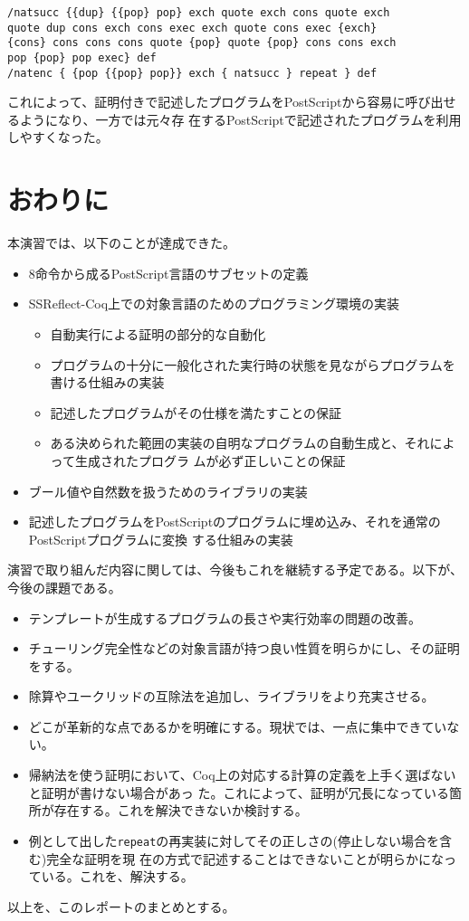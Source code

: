 \documentclass[a4paper, 10pt, twocolumn, titlepage]{ujarticle}
\renewcommand{\{}{\symbol{"7B}}
\renewcommand{\}}{\symbol{"7D}}
\begin{document}
\begin{lstlisting}[style=plain]
/natsucc {{dup} {{pop} pop} exch quote exch cons quote exch
quote dup cons exch cons exec exch quote cons exec {exch}
{cons} cons cons cons quote {pop} quote {pop} cons cons exch
pop {pop} pop exec} def
/natenc { {pop {{pop} pop}} exch { natsucc } repeat } def
\end{lstlisting}

これによって、証明付きで記述したプログラムをPostScriptから容易に呼び出せるようになり、一方では元々存
在するPostScriptで記述されたプログラムを利用しやすくなった。

\section{おわりに}

本演習では、以下のことが達成できた。

\begin{itemize}
 \item 8命令から成るPostScript言語のサブセットの定義
 \item SSReflect-Coq上での対象言語のためのプログラミング環境の実装
       \begin{itemize}
	\item 自動実行による証明の部分的な自動化
	\item プログラムの十分に一般化された実行時の状態を見ながらプログラムを書ける仕組みの実装
	\item 記述したプログラムがその仕様を満たすことの保証
	\item ある決められた範囲の実装の自明なプログラムの自動生成と、それによって生成されたプログラ
	      ムが必ず正しいことの保証
       \end{itemize}
 \item ブール値や自然数を扱うためのライブラリの実装
 \item 記述したプログラムをPostScriptのプログラムに埋め込み、それを通常のPostScriptプログラムに変換
       する仕組みの実装
\end{itemize}

演習で取り組んだ内容に関しては、今後もこれを継続する予定である。以下が、今後の課題である。

\begin{itemize}
 \item テンプレートが生成するプログラムの長さや実行効率の問題の改善。
 \item チューリング完全性などの対象言語が持つ良い性質を明らかにし、その証明をする。
 \item 除算やユークリッドの互除法を追加し、ライブラリをより充実させる。
 \item どこが革新的な点であるかを明確にする。現状では、一点に集中できていない。
 \item 帰納法を使う証明において、Coq上の対応する計算の定義を上手く選ばないと証明が書けない場合があっ
       た。これによって、証明が冗長になっている箇所が存在する。これを解決できないか検討する。
 \item 例として出した\texttt{repeat}の再実装に対してその正しさの(停止しない場合を含む)完全な証明を現
       在の方式で記述することはできないことが明らかになっている。これを、解決する。
\end{itemize}

以上を、このレポートのまとめとする。
\end{document}
